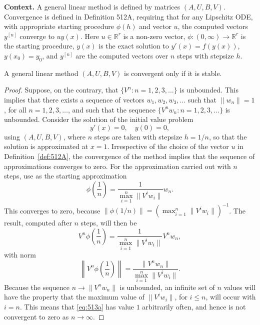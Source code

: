 \noindent\textbf{Context.}
A general linear method is defined by matrices $(A, U, B, V)$. Convergence is defined in Definition 512A, requiring that for any Lipschitz ODE, with appropriate starting procedure $\phi(h)$ and vector $u$, the computed vectors $y^{[n]}$ converge to $u y(x)$. Here $u \in \mathbb{R}^{r}$ is a non-zero vector, $\phi : (0, \infty) \to \mathbb{R}^{r}$ is the starting procedure, $y(x)$ is the exact solution to $y'(x) = f(y(x))$, $y(x_0) = y_0$, and $y^{[n]}$ are the computed vectors over $n$ steps with stepsize $h$.

\begin{theorem}

  \label{thm:513A}
A general linear method $(A, U, B, V)$ is convergent only if it is stable.
\end{theorem}

\begin{proof}
Suppose, on the contrary, that $\{ V^{n} : n = 1, 2, 3, \dots \}$ is unbounded.
This implies that there exists a sequence of vectors $w_{1}, w_{2}, w_{3}, \dots$ such that
$\| w_{n} \| = 1$, for all $n = 1, 2, 3, \dots$, and such that the sequence $\{ V^{n} w_{n} : n = 1, 2, 3, \dots \}$ is unbounded.
Consider the solution of the initial value problem
\[
y'(x) = 0, \quad y(0) = 0,
\]
using $(A, U, B, V)$, where $n$ steps are taken with stepsize $h = 1/n$, so that the
solution is approximated at $x = 1$. Irrespective of the choice of the vector $u$
in Definition~\ref{def:512A}, the convergence of the method implies that the sequence
of approximations converges to zero. For the approximation carried out with
$n$ steps, use as the starting approximation
\[
\phi\left( \frac{1}{n} \right) = \frac{1}{\max_{i=1}^{n} \| V^{i} w_{i} \|} w_{n}.
\]
This converges to zero, because $\| \phi(1/n) \| = \left( \max_{i=1}^{n} \| V^{i} w_{i} \| \right)^{-1}$. The result,
computed after $n$ steps, will then be
\[
V^{n} \phi\left( \frac{1}{n} \right) = \frac{1}{\max_{i=1}^{n} \| V^{i} w_{i} \|} V^{n} w_{n},
\]
with norm
\[
\left\| V^{n} \phi\left( \frac{1}{n} \right) \right\| = \frac{\| V^{n} w_{n} \|}{\max_{i=1}^{n} \| V^{i} w_{i} \|}. \tag{513a}
\]
Because the sequence $n \to \| V^{n} w_{n} \|$ is unbounded, an infinite set of $n$ values
will have the property that the maximum value of $\| V^{i} w_{i} \|$, for $i \leq n$, will
occur with $i = n$. This means that \eqref{eq:513a} has value $1$ arbitrarily often, and
hence is not convergent to zero as $n \to \infty$.
\end{proof}

